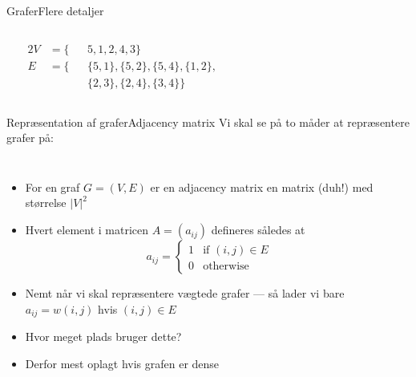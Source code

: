 \documentclass[aspectratio=1610]{beamer}
\begin{document}
\begin{frame}{Grafer}{Flere detaljer}
\begin{columns}
\begin{center}
        \end{center}
        \begin{alignat*}{2}
            V&= \{&& 5,1,2,4,3\} \\
            E&= \{&&\{5,1\},\{5,2\},\{5,4\},\{1,2\}, \\
             &    &&\{2,3\},\{2,4\},\{3,4\} \} 
        \end{alignat*}

    \end{columns}
\end{frame}


\begin{frame}{Repræsentation af grafer}{Adjacency matrix}
    Vi skal se på to måder at repræsentere grafer på:

    \begin{columns}
        \begin{itemize}[<+(1)->]
            \item For en graf $G = (V,E)$ er en \alert{adjacency matrix} en
                matrix (duh!) med størrelse $|V|^2$
            \item Hvert element i matricen $A=(a_{ij})$ defineres således at
                \begin{equation*}
                    a_{ij} =
                    \begin{cases}
                        1 & \text{if } (i,j) \in E \\
                        0 & \text{otherwise}
                    \end{cases}
                \end{equation*}
            \item Nemt når vi skal repræsentere \alert{vægtede} grafer --- så
                lader vi bare $a_{ij} = w(i,j)$ hvis $(i,j) \in E$
            \item Hvor meget plads bruger dette? 
            \item Derfor mest oplagt hvis grafen er dense
        \end{itemize}
    
        \begin{center}
\end{center}
\end{columns}
\end{frame}
\end{document}
